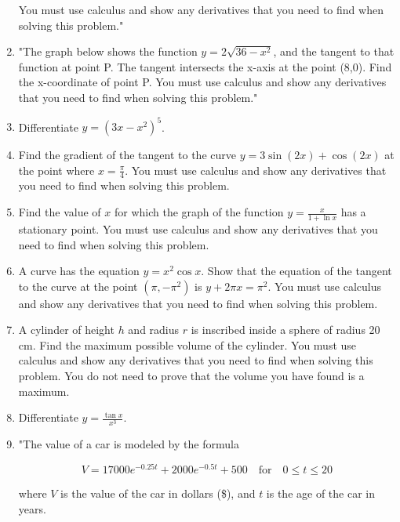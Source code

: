 \documentclass{article}
\begin{document}
\begin{enumerate}
You must use calculus and show any derivatives that you need to find when solving this problem."
\vspace{3cm}
\item "The graph below shows the function \( y = 2\sqrt{36 - x^2} \), and the tangent to that function at point P. The tangent intersects the x-axis at the point (8,0). Find the x-coordinate of point P. You must use calculus and show any derivatives that you need to find when solving this problem."
\vspace{3cm}
\item Differentiate \( y = (3x - x^2)^5 \).
\vspace{3cm}
\item Find the gradient of the tangent to the curve \( y = 3\sin(2x) + \cos(2x) \) at the point where \( x = \frac{\pi}{4} \). You must use calculus and show any derivatives that you need to find when solving this problem.
\vspace{3cm}
\item Find the value of \( x \) for which the graph of the function \( y = \frac{x}{1 + \ln x} \) has a stationary point. You must use calculus and show any derivatives that you need to find when solving this problem.
\vspace{3cm}
\item A curve has the equation \( y = x^2 \cos x \). Show that the equation of the tangent to the curve at the point \( \left( \pi, -\pi^2 \right) \) is \( y + 2\pi x = \pi^2 \). You must use calculus and show any derivatives that you need to find when solving this problem.
\vspace{3cm}
\item A cylinder of height \( h \) and radius \( r \) is inscribed inside a sphere of radius 20 cm. Find the maximum possible volume of the cylinder. You must use calculus and show any derivatives that you need to find when solving this problem. You do not need to prove that the volume you have found is a maximum.
\vspace{3cm}
\item Differentiate \( y = \frac{\tan x}{x^3} \).
\vspace{3cm}
\item "The value of a car is modeled by the formula

\[ V = 17000 e^{-0.25t} + 2000 e^{-0.5t} + 500 \quad \text{for} \quad 0 \leq t \leq 20 \]

where \( V \) is the value of the car in dollars (\$), and \( t \) is the age of the car in years.


\end{enumerate}
\end{document}
